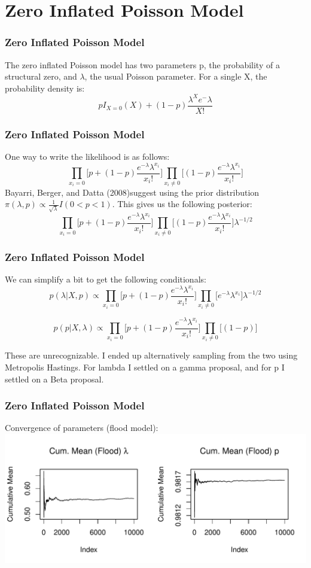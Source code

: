 \documentclass{beamer}
\begin{document}
	\section{Zero Inflated Poisson Model}
	\begin{frame}
		\frametitle{Zero Inflated Poisson Model}
		The zero inflated Poisson model has two parameters p, the probability of a structural zero, and $\lambda$, the usual Poisson parameter. 
		For a single X, the probability density is:
		$$pI_{X=0}(X) + (1-p)\frac{\lambda^Xe^-\lambda}{X!}$$
	\end{frame}
	\begin{frame}
		\frametitle{Zero Inflated Poisson Model}
		One way to write the likelihood is as follows:
		$$\prod_{x_i=0}\bigg[p+(1-p)\frac{e^{-\lambda}\lambda^{x_i}}{x_i!}\bigg]\prod_{x_i \ne 0}\bigg[(1-p)\frac{e^{-\lambda}\lambda^{x_i}}{x_i!}\bigg]$$
		Bayarri, Berger, and Datta (2008)\footnotemark suggest using the prior distribution $\pi(\lambda, p) \propto \frac{1}{\sqrt{\lambda}}I(0<p<1)$. This gives us the following posterior:
		$$\prod_{x_i=0}\bigg[p+(1-p)\frac{e^{-\lambda}\lambda^{x_i}}{x_i!}\bigg]\prod_{x_i \ne 0}\bigg[(1-p)\frac{e^{-\lambda}\lambda^{x_i}}{x_i!}\bigg]\lambda^{-1/2}$$
	\end{frame}
	\begin{frame}
		\frametitle{Zero Inflated Poisson Model}
		We can simplify a bit to get the following conditionals:
		\[
p(\lambda|X, p) \propto \prod_{x_i=0}\bigg[p+(1-p)\frac{e^{-\lambda}\lambda^{x_i}}{x_i!}\bigg]\prod_{x_i \ne 0}\bigg[e^{-\lambda}\lambda^{x_i}\bigg]\lambda^{-1/2}
\]

\[
p(p|X, \lambda) \propto \prod_{x_i=0}\bigg[p+(1-p)\frac{e^{-\lambda}\lambda^{x_i}}{x_i!}\bigg]\prod_{x_i \ne 0}\bigg[(1-p)\bigg]
\]

These are unrecognizable. I ended up alternatively sampling from the two using Metropolis Hastings. For lambda I settled on a gamma proposal, and for p I settled on a Beta proposal. 
	\end{frame}
	\begin{frame}
		\frametitle{Zero Inflated Poisson Model}
		Convergence of parameters (flood model):
		\centering
		\includegraphics[width=.9\textwidth]{figure/ZIP_Flood_Conv.pdf} 
	\end{frame}
\end{document}
